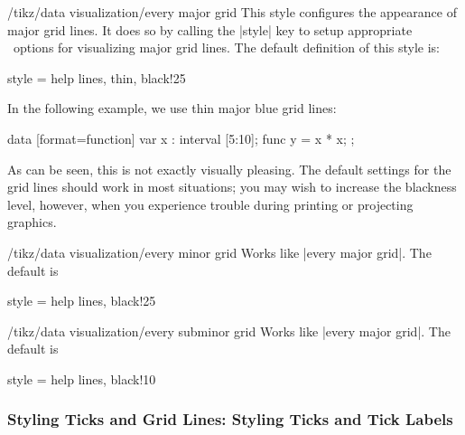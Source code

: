 \begin{stylekey}{/tikz/data visualization/every major grid}
    This style configures the appearance of major grid lines. It does so by
    calling the |style| key to setup appropriate \tikzname\ options for
    visualizing major grid lines. The default definition of this style is:
\begin{codeexample}
style = {help lines, thin, black!25}
\end{codeexample}
    In the following example, we use thin major blue grid lines:
\begin{codeexample}[preamble={\usetikzlibrary{datavisualization.formats.functions}}]
\tikz \datavisualization
  [scientific axes,
   all axes={
     length=3cm,
     grid,
     grid={minor steps between steps}
   },
   every major grid/.style = {style={blue, thin}},
   visualize as line]
  data [format=function] {
    var x : interval [5:10];
    func y = \value x * \value x;
  };
\end{codeexample}
    As can be seen, this is not exactly visually pleasing. The default settings
    for the grid lines should work in most situations; you may wish to increase
    the blackness level, however, when you experience trouble during printing
    or projecting graphics.
\end{stylekey}

\begin{stylekey}{/tikz/data visualization/every minor grid}
    Works like |every major grid|. The default is
\begin{codeexample}
style = {help lines, black!25}
\end{codeexample}
\end{stylekey}

\begin{stylekey}{/tikz/data visualization/every subminor grid}
    Works like |every major grid|. The default is
\begin{codeexample}
style = {help lines, black!10}
\end{codeexample}
\end{stylekey}


\subsubsection{Styling Ticks and Grid Lines: Styling Ticks and Tick Labels}
\label{section-dv-styling-ticks}

